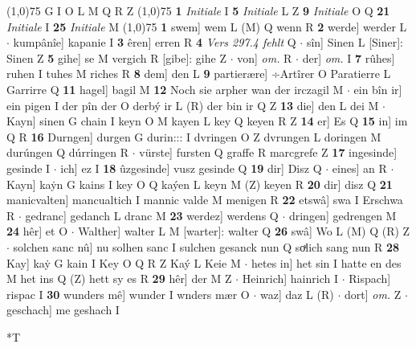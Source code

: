 \documentclass[8pt,a4paper,notitlepage]{article}
\begin{document}
\begin{table}[ht]
\begin{minipage}[t]{0.5\linewidth}
\scriptsize
\line(1,0){75} \newline
G I O L M Q R Z \newline
\line(1,0){75} \newline
\textbf{1} \textit{Initiale} I  \textbf{5} \textit{Initiale} L Z  \textbf{9} \textit{Initiale} O Q  \textbf{21} \textit{Initiale} I  \textbf{25} \textit{Initiale} M  \newline
\line(1,0){75} \newline
\textbf{1} swem] wem L (M) Q wenn R \textbf{2} werde] werder L  $\cdot$ kumpânîe] kapanie I \textbf{3} êren] erren R \textbf{4} \textit{Vers 297.4 fehlt} Q   $\cdot$ sîn] Sinen L [Siner]: Sinen Z \textbf{5} gihe] se M vergich R [gibe]: gihe Z  $\cdot$ von] \textit{om.} R  $\cdot$ der] \textit{om.} I \textbf{7} rûhes] ruhen I tuhes M riches R \textbf{8} dem] den L \textbf{9} partierære] ÷Artîrer O Paratierre L Garrirre Q \textbf{11} hagel] bagil M \textbf{12} Noch sie arpher wan der irczagil M  $\cdot$ ein bîn ir] ein pigen I der pîn der O derbý ir L (R) der bin ir Q Z \textbf{13} die] den L dei M  $\cdot$ Kayn] sinen G chain I keyn O M kayen L key Q keyen R Z \textbf{14} er] Es Q \textbf{15} in] im Q R \textbf{16} Durngen] durgen G durin::: I dvringen O Z dvrungen L doringen M durúngen Q dúrringen R  $\cdot$ vürste] fursten Q graffe R marcgrefe Z \textbf{17} ingesinde] gesinde I  $\cdot$ ich] ez I \textbf{18} ûzgesinde] vusz gesinde Q \textbf{19} dir] Disz Q  $\cdot$ eines] an R  $\cdot$ Kayn] kaẏn G kains I key O Q kaýen L keyn M (Z) keyen R \textbf{20} dir] disz Q \textbf{21} manicvalten] mancualtich I mannic valde M menigen R \textbf{22} etswâ] swa I Erschwa R  $\cdot$ gedranc] gedanch L dranc M \textbf{23} werdez] werdens Q  $\cdot$ dringen] gedrengen M \textbf{24} hêr] et O  $\cdot$ Walther] walter L M [warter]: walter Q \textbf{26} swâ] Wo L (M) Q (R) Z  $\cdot$ solchen sanc nû] nu solhen sanc I sulchen gesanck nun Q soͯlich sang nun R \textbf{28} Kay] kaẏ G kain I Key O Q R Z Kaý L Keie M  $\cdot$ hetes in] het sin I hatte en des M het ins Q (Z) hett sy es R \textbf{29} hêr] der M Z  $\cdot$ Heinrich] hainrich I  $\cdot$ Rispach] rispac I \textbf{30} wunders mê] wunder I wnders mær O  $\cdot$ waz] daz L (R)  $\cdot$ dort] \textit{om.} Z  $\cdot$ geschach] me geshach I \newline
\end{minipage}
\hspace{0.5cm}
\begin{minipage}[t]{0.5\linewidth}
\small
\begin{center}*T
\end{center}

\end{minipage}
\end{table}
\end{document}
